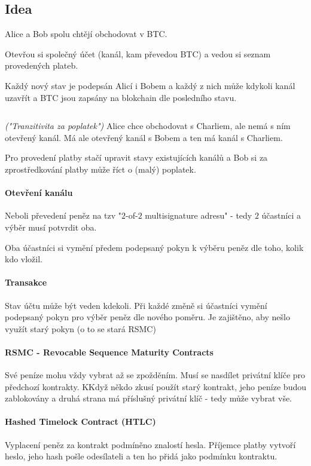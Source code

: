 \documentclass[10pt,a4paper]{article}
\begin{document}
\subsection{Idea}

Alice a Bob spolu chtějí obchodovat v BTC.

Otevřou si společný účet (kanál, kam převedou BTC) a vedou si seznam provedených plateb.

Každý nový stav je podepsán Alicí i Bobem a každý z nich může kdykoli kanál uzavřít a BTC jsou zapsány na blokchain dle posledního stavu.

$ $

\textit{("Tranzitivita za poplatek")}
Alice chce obchodovat s Charliem, ale nemá s ním otevřený kanál.
Má ale otevřený kanál s Bobem a ten má kanál s Charliem. 

Pro provedení platby stačí upravit stavy existujících kanálů a Bob si za zprostředkování platby může říct o (malý)
poplatek.

\paragraph{Otevření kanálu} Neboli převedení peněz na tzv "$ 2 $-of-$ 2 $ multisignature adresu" - tedy $ 2 $ účastníci a výběr musí potvrdit oba.

Oba účastníci si vymění předem podepsaný pokyn k výběru peněz dle toho, kolik kdo vložil.

\paragraph{Transakce}

Stav účtu může být veden kdekoli.
Při každé změně si účastníci vymění podepsaný pokyn pro výběr peněz dle nového poměru.
Je zajištěno, aby nešlo využít starý pokyn (o to se stará RSMC)

\paragraph{RSMC - Revocable Sequence Maturity Contracts}
Své peníze mohu vždy vybrat až se zpožděním.
Musí se nasdílet privátní klíče pro předchozí kontrakty.
KKdyž někdo zkusí použít starý kontrakt, jeho peníze budou zablokovány a druhá strana má příslušný privátní klíč - tedy může vybrat vše.

\paragraph{Hashed Timelock Contract (HTLC)} Vyplacení peněz za kontrakt podmíněno znalostí hesla.
Příjemce platby vytvoří heslo, jeho hash pošle odesílateli a ten ho přidá jako podmínku kontraktu.
\end{document}
